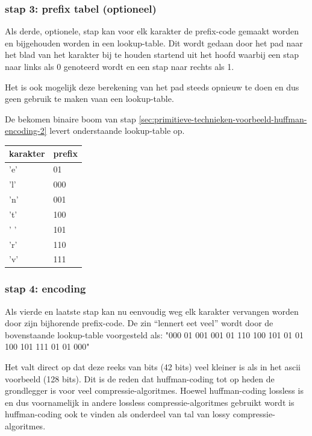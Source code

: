 \subsubsection{stap 3: prefix tabel (optioneel)}
\label{sec:primitieve-technieken-voorbeeld-huffman-encoding-3}
Als derde, optionele, stap kan voor elk karakter de \gls{prefix-code} gemaakt worden en bijgehouden worden in een \gls{lookup-table}. Dit wordt gedaan door het pad naar het blad van het karakter bij te houden startend uit het hoofd waarbij een stap naar links als 0 genoteerd wordt en een stap naar rechts als 1.

Het is ook mogelijk deze berekening van het pad steeds opnieuw te doen en dus geen gebruik te maken vaan een \gls{lookup-table}.

De bekomen binaire boom van stap \ref{sec:primitieve-technieken-voorbeeld-huffman-encoding-2} levert onderstaande \gls{lookup-table} op.

\FloatBarrier
\begin{table}[h!]
	\begin{tabular}{|l|l|}
		\hline
		\textbf{karakter} & \textbf{prefix} \\ \hline
		'e'               & 01              \\ \hline
		'l'               & 000             \\ \hline
		'n'               & 001             \\ \hline
		't'               & 100             \\ \hline
		' '               & 101             \\ \hline
		'r'               & 110             \\ \hline
		'v'               & 111             \\ \hline  
	\end{tabular}
\end{table}
\FloatBarrier

\subsubsection{stap 4: encoding}
\label{sec:primitieve-technieken-voorbeeld-huffman-encoding-4}
Als vierde en laatste stap kan nu eenvoudig weg elk karakter vervangen worden door zijn bijhorende \gls{prefix-code}. De zin “lennert eet veel” wordt door de bovenstaande \gls{lookup-table} voorgesteld als:
"000 01 001 001 01 110 100 101 01 01 100 101 111 01 01 000"

Het valt direct op dat deze reeks van \glspl{bit} (42 \glspl{bit}) veel kleiner is als in het \gls{ascii} voorbeeld (128 \glspl{bit}). Dit is de reden dat \gls{huffman-coding} tot op heden de grondlegger is voor veel \glspl{compressie-algoritme}. Hoewel \gls{huffman-coding} \gls{lossless} is en dus voornamelijk in andere \gls{lossless} \glspl{compressie-algoritme} gebruikt wordt is \gls{huffman-coding} ook te vinden als onderdeel van tal van \gls{lossy} \glspl{compressie-algoritme}.


